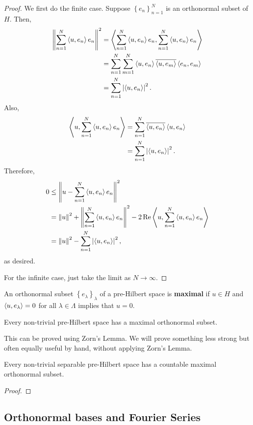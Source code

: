 \documentclass[a4paper]{article}
\begin{document}
\begin{proof}
  We first do the finite case. Suppose $\left\{ e_n \right\}
  _{n=1}^N$ is an orthonormal subset of $H$. Then, 
  \[
  \begin{aligned}
  \left\lVert \sum_{n=1}^N \left\langle u, e_n \right\rangle e_n\right\rVert^2 
  &= \left\langle \sum_{n=1}^N \left\langle u, e_n \right\rangle e_n , \sum_{n=1}^N \left\langle u, e_n \right\rangle e_n \right\rangle \\
  &= \sum_{n=1}^N 
  \sum_{m=1}^N \left\langle u, e_n \right\rangle \overline{\left\langle u, e_m \right\rangle} \left\langle e_n, e_m \right\rangle \\
  &= \sum_{n=1}^N \left\lvert \left\langle u, e_n \right\rangle\right\rvert^2.
  \end{aligned}
  \]
  Also, 
  \[
  \begin{aligned}
  \left\langle u, \sum_{n=1}^N \left\langle u, e_n \right\rangle e_n \right\rangle 
  &= \sum_{n=1}^N \overline{\left\langle u, e_n \right\rangle} \left\langle u, e_n \right\rangle \\
  &= \sum_{n=1}^N \left\lvert \left\langle u, e_n \right\rangle\right\rvert^2.
  \end{aligned}
  \]
  Therefore, 
  \[
  \begin{aligned}
  0 
  &\leq \left\lVert u - \sum_{n=1}^N \left\langle u, e_n \right\rangle e_n\right\rVert^2 \\
  &= \left\lVert u\right\rVert^2 + \left\lVert \sum_{n=1}^N \left\langle u, e_n \right\rangle e_n\right\rVert^2 
  - 2 \operatorname{Re} \left\langle u, \sum_{n=1}^N \left\langle u, e_n \right\rangle e_n \right\rangle \\
  &= \left\lVert u\right\rVert^2 - \sum_{n=1}^N \left\lvert \left\langle u, e_n \right\rangle\right\rvert^2,
  \end{aligned}
  \]
  as desired.

  For the infinite case, just take the limit as  
  $N \to \infty$.
\end{proof}

\begin{defi}
  An orthonormal subset $\left\{ e_\lambda \right\}_\lambda$
  of a pre-Hilbert space is \textbf{maximal} if $u \in H$ 
  and $\left\langle u, e_\lambda \right\rangle = 0$ for all $\lambda \in \Lambda$
  implies that $u = 0$.
\end{defi}

\begin{thm}
  Every non-trivial pre-Hilbert space has a maximal 
  orthonormal subset.
\end{thm}

This can be proved using Zorn's Lemma. We will prove 
something less strong but often equally useful by hand, 
without applying Zorn's Lemma.

\begin{thm}
  Every non-trivial separable pre-Hilbert space 
  has a countable maximal orthonormal subset.
\end{thm}

\begin{proof}

\end{proof}

\subsection{Orthonormal bases and Fourier Series}
\end{document}
